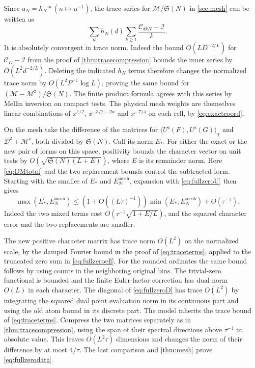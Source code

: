 \documentclass[11pt,a4paper]{article}
\numberwithin{equation}{section}
\newcommand{\SSS}{\mathfrak S}
\begin{document}
Since $a_N=h_N*(n\mapsto n^{-1})$, the trace series
for $\mathcal M/\SSS(N)$ in \cref{sec:mesh} can be
written as
\[
 \sum_d h_N(d)\sum_{k\ge1}
          \frac{\mathcal C_{dkN}-\mathcal I}{k}.
\]
It is absolutely convergent in trace norm. Indeed the
bound $O(L D^{-2/L})$ for $\mathcal C_D-\mathcal I$
from the proof of \cref{thm:tracecompression} bounds
the inner series by $O(L^2d^{-2/L})$. Deleting the
indicated $h_N$ terms therefore changes the normalized
trace norm by $O(L^2P^{-1}\log L)$, proving the same
bound for $(\mathcal M-\mathcal M^{\mathrm z})/\SSS(N)$.
The finite product formula agrees with this series by
Mellin inversion on compact tests. The physical mesh
weights are themselves linear combinations of $x^{1/2}$,
$x^{-3/2-2\alpha}$ and $x^{-7/4}$ on each cell, by
\cref{eq:exactcoord}.

On the mesh take the difference of the matrices for
$\langle U^{\mathrm z}(F),U^{\mathrm z}(G)\rangle_\chi$
and $\mathcal D^{\mathrm z}+\mathcal M^{\mathrm z}$, both divided by
$\SSS(N)$. Call its norm $E_*$. For either the exact
or the new pair of forms on this space, positivity
bounds the character vector on unit tests by
$O(\sqrt{\SSS(N)(L+E)})$, where $E$ is its remainder norm.
Here \cref{eq:DMtotal} and the two replacement bounds
control the subtracted form. Starting with the smaller
of $E_*$ and $E_N^{\mathrm{mesh}}$, expansion with
\cref{eq:fullzeroU} then gives
\[
 \max(E_*,E_N^{\mathrm{mesh}})
   \le (1+O((L\tau)^{-1}))\min(E_*,E_N^{\mathrm{mesh}})
                  +O(\tau^{-1}).
\]
Indeed the two mixed terms cost
$O(\tau^{-1}\sqrt{1+E/L})$, and the squared character
error and the two replacements are smaller.

The new positive character matrix has trace norm
$O(L^2)$ on the normalized scale, by the damped
Fourier bound in the proof of \cref{eq:traceterms},
applied to the truncated zero sum in \cref{eq:fullzeroell}.
For the rounded ordinates the same bound follows by using
counts in the neighboring original bins.
The trivial-zero functional is bounded and the finite
Euler-factor correction has dual norm $O(L)$ in each
character. The diagonal of \cref{eq:fullzeroD} has
trace $O(L^2)$ by integrating the squared dual point
evaluation norm in its continuous part and using the
old atom bound in its discrete part. The model inherits
the trace bound of \cref{eq:traceterms}. Compress the two
matrices separately as in \cref{thm:tracecompression},
using the span of their spectral directions above
$\tau^{-1}$ in absolute value. This leaves $O(L^2\tau)$
dimensions and changes the norm of their difference by
at most $4/\tau$. The last comparison and
\cref{thm:mesh} prove \cref{eq:fullzerodata}.
\end{document}
